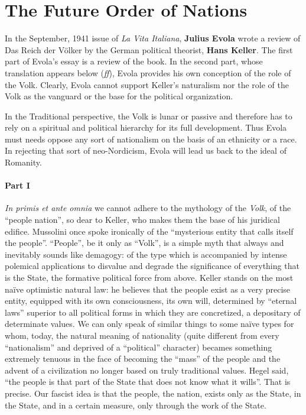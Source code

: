 \section{The Future Order of Nations}

\begin{quotationx}
In the September, 1941 issue of \textit{La Vita Italiana}, \textbf{Julius Evola} wrote a review of Das Reich der Völker by the German political theorist, \textbf{Hans Keller}. The first part of Evola's essay is a review of the book. In the second part, whose translation appears below (\emph{ff}), Evola provides his own conception of the role of the Volk. Clearly, Evola cannot support Keller's naturalism nor the role of the Volk as the vanguard or the base for the political organization.

In the Traditional perspective, the Volk is lunar or passive and therefore has to rely on a spiritual and political hierarchy for its full development. Thus Evola must needs oppose any sort of nationalism on the basis of an ethnicity or a race. In rejecting that sort of neo-Nordicism, Evola will lead us back to the ideal of Romanity.
\end{quotationx}

\paragraph{Part I} \emph{In primis et ante omnia} we cannot adhere to the mythology of the \emph{Volk}, of the ``people nation'', so dear to Keller, who makes them the base of his juridical edifice. Mussolini once spoke ironically of the ``mysterious entity that calls itself the people''. ``People'', be it only as ``Volk'', is a simple myth that always and inevitably sounds like demagogy: of the type which is accompanied by intense polemical applications to disvalue and degrade the significance of everything that is the State, the formative political force from above. Keller stands on the most naïve optimistic natural law: he believes that the people exist as a very precise entity, equipped with its own consciousness, its own will, determined by ``eternal laws'' superior to all political forms in which they are concretized, a depositary of determinate values. We can only speak of similar things to some naïve types for whom, today, the natural meaning of nationality (quite different from every ``nationalism'' and deprived of a ``political'' character) becames something extremely tenuous in the face of becoming the ``mass'' of the people and the advent of a civilization no longer based on truly traditional values. Hegel said, ``the people is that part of the State that does not know what it wills''. That is precise. Our fascist idea is that the people, the nation, exists only as the State, in the State, and in a certain measure, only through the work of the State.

